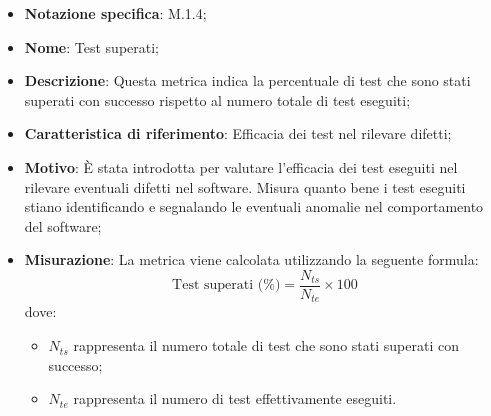 \begin{itemize}
    \item \textbf{Notazione specifica}: M.1.4;
    \item \textbf{Nome}: Test superati;
    \item \textbf{Descrizione}: Questa metrica indica la percentuale di test che sono stati superati con successo rispetto al numero totale di test eseguiti;
    \item \textbf{Caratteristica di riferimento}: Efficacia dei test nel rilevare difetti;
    \item \textbf{Motivo}: È stata introdotta per valutare l'efficacia dei test eseguiti nel rilevare eventuali difetti nel software. Misura quanto bene i test eseguiti stiano identificando e segnalando le eventuali anomalie nel comportamento del software;
    \item \textbf{Misurazione}: La metrica viene calcolata utilizzando la seguente formula:
    \[
    \text{Test superati (\%)} = \frac{N_{ts}}{N_{te}} \times 100
    \]
    dove:
    \begin{itemize}
        \item $N_{ts}$ rappresenta il numero totale di test che sono stati superati con successo;
        \item $N_{te}$ rappresenta il numero di test effettivamente eseguiti.
    \end{itemize}

\end{itemize}
